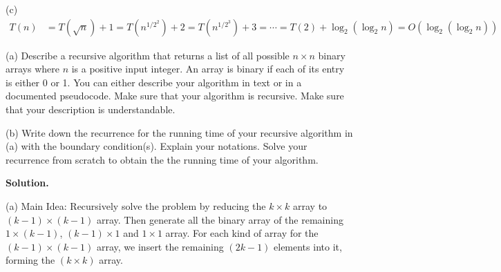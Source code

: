 \documentclass[10pt]{article}
\begin{document}
(c)
$$
\begin{aligned}
	T(n) &= T(\sqrt{n}) + 1 = T(n^{1/2^2}) + 2 = T(n^{1/2^3}) + 3 = \cdots = T(2) + \log_2 (\log_2 n) = O(\log_2 (\log_2 n))
\end{aligned}
$$

\newpage

\begin{Problem}
	
	\noindent (a) Describe a recursive algorithm that returns a list of all possible $n\times n$ binary arrays where $n$ is a positive input integer. An array is binary if each of its entry is either 0 or 1. You can either describe your algorithm in text or in a documented pseudocode. Make sure that your algorithm is recursive. Make sure that your description is understandable.
	
	\noindent (b) Write down the recurrence for the running time of your
	recursive algorithm in (a) with the boundary condition(s). Explain your notations. Solve your recurrence from scratch to obtain the
	the running time of your algorithm.
	
\end{Problem}

\textbf{Solution.}

(a) Main Idea: Recursively solve the problem by reducing the $k\times k$ array to $(k-1)\times (k-1)$ array. Then generate all the binary array of the remaining $1\times (k-1)$, $(k-1)\times 1$ and $1\times 1$ array. For each kind of array for the $(k-1)\times (k-1)$ array, we insert the remaining $(2k-1)$ elements into it, forming the $(k\times k)$ array.
\end{document}
